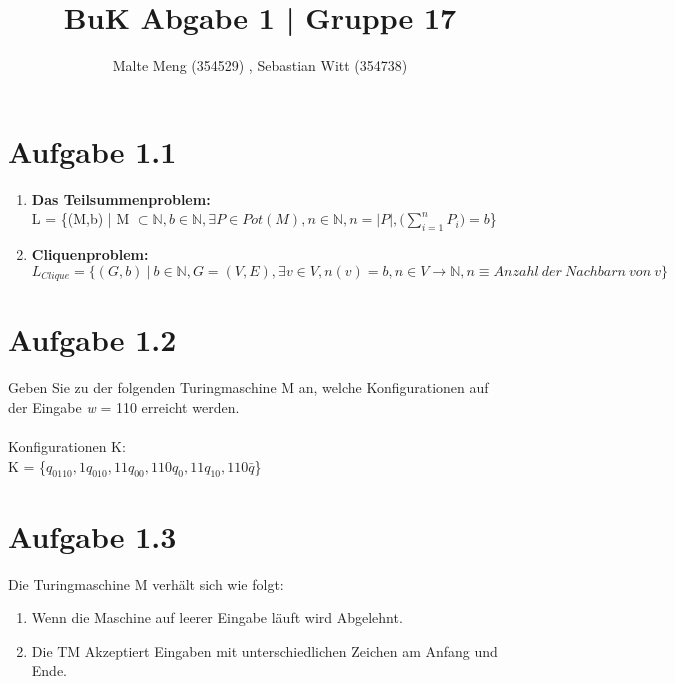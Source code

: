 \documentclass{article}
\title{BuK Abgabe 1 | Gruppe 17}
\author{Malte Meng (354529) , Sebastian Witt (354738)}
\begin{document}
	\maketitle 
	\section[a 1.1]{Aufgabe 1.1}
	\begin{enumerate} [label=\alph*.]
		\item \textbf{Das Teilsummenproblem:}\\
		L = \{(M,b) | M $\subset \mathbb{N} , b \in \mathbb{N} , \exists P \in Pot(M), n \in \mathbb{N}, n = |P|, \big(\sum_{i=1}^{n} P_i \big)= b$\}
		\item \textbf{Cliquenproblem:}\\
		$L_{Clique} = \{ (G,b)\ |\ b \in \mathbb{N},G = (V,E),\exists v \in V, n(v) = b, n \in V \rightarrow \mathbb{N}, n \equiv Anzahl\ der\ Nachbarn\ von\ v \}$
	\end{enumerate}
	\section[a 1.2]{Aufgabe 1.2}
	Geben Sie zu der folgenden Turingmaschine M an, welche Konfigurationen auf der Eingabe \textit{w} = 110 erreicht werden.
	\\\\
	Konfigurationen K:\\
	K =  \{$q_0110 , 1q_010 , 11q_00 , 110q_0 , 11q_10 , 110\bar{q}$\}
	\section[a 1.3]{Aufgabe 1.3}
	Die Turingmaschine M verhält sich wie folgt:\\
	\begin{enumerate}[label=-]
		\item Wenn die Maschine auf leerer Eingabe läuft wird Abgelehnt.\\
		\item Die TM Akzeptiert Eingaben mit unterschiedlichen Zeichen am Anfang und Ende.
	\end{enumerate}
	\pagebreak
\end{document}
